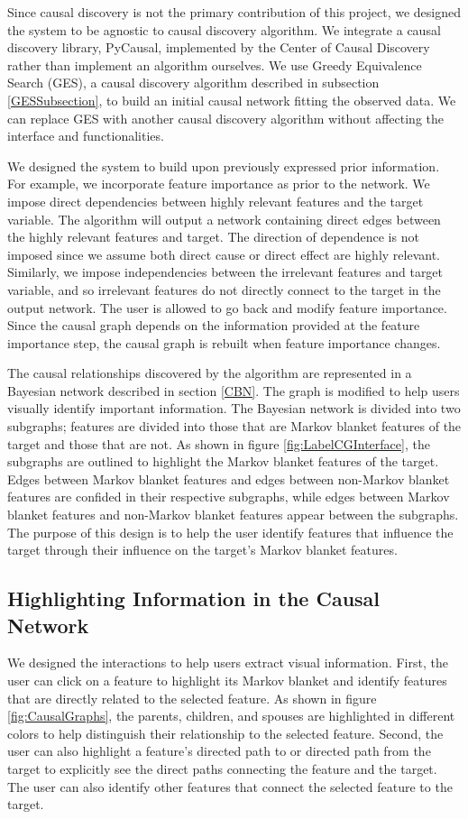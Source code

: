 Since causal discovery is not the primary contribution of this project, we designed the system to be agnostic to causal discovery algorithm. We integrate a causal discovery library, PyCausal, implemented by the Center of Causal Discovery rather than implement an algorithm ourselves. We use Greedy Equivalence Search (GES), a causal discovery algorithm described in subsection \ref{GESSubsection}, to build an initial causal network fitting the observed data. We can replace GES with another causal discovery algorithm without affecting the interface and functionalities.

We designed the system to build upon previously expressed prior information. For example, we incorporate feature importance as prior to the network. We impose direct dependencies between highly relevant features and the target variable. The algorithm will output a network containing direct edges between the highly relevant features and target. The direction of dependence is not imposed since we assume both direct cause or direct effect are highly relevant. Similarly, we impose independencies between the irrelevant features and target variable, and so irrelevant features do not directly connect to the target in the output network. The user is allowed to go back and modify feature importance. Since the causal graph depends on the information provided at the feature importance step, the causal graph is rebuilt when feature importance changes.

The causal relationships discovered by the algorithm are represented in a Bayesian network described in section \ref{CBN}. The graph is modified to help users visually identify important information. The Bayesian network is divided into two subgraphs; features are divided into those that are Markov blanket features of the target and those that are not. As shown in figure \ref{fig:LabelCGInterface}, the subgraphs are outlined to highlight the Markov blanket features of the target. Edges between Markov blanket features and edges between non-Markov blanket features are confided in their respective subgraphs, while edges between Markov blanket features and non-Markov blanket features appear between the subgraphs. The purpose of this design is to help the user identify features that influence the target through their influence on the target's Markov blanket features. 

\subsection{Highlighting Information in the Causal Network}
We designed the interactions to help users extract visual information. First, the user can click on a feature to highlight its Markov blanket and identify features that are directly related to the selected feature. As shown in figure \ref{fig:CausalGraphs}, the parents, children, and spouses are highlighted in different colors to help distinguish their relationship to the selected feature. Second, the user can also highlight a feature’s directed path to or directed path from the target to explicitly see the direct paths connecting the feature and the target. The user can also identify other features that connect the selected feature to the target.

